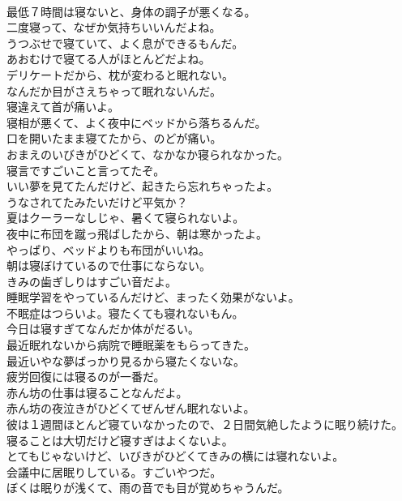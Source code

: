 \documentclass[8pt]{extreport}
\begin{document}
\begin{CJK}{UTF8}{min}
\\	最低７時間は寝ないと、身体の調子が悪くなる。	
\\	二度寝って、なぜか気持ちいいんだよね。	
\\	うつぶせで寝ていて、よく息ができるもんだ。	
\\	あおむけで寝てる人がほとんどだよね。	
\\	デリケートだから、枕が変わると眠れない。	
\\	なんだか目がさえちゃって眠れないんだ。	
\\	寝違えて首が痛いよ。	
\\	寝相が悪くて、よく夜中にベッドから落ちるんだ。	
\\	口を開いたまま寝てたから、のどが痛い。	
\\	おまえのいびきがひどくて、なかなか寝られなかった。	
\\	寝言ですごいこと言ってたぞ。	
\\	いい夢を見てたんだけど、起きたら忘れちゃったよ。	
\\	うなされてたみたいだけど平気か？	
\\	夏はクーラーなしじゃ、暑くて寝られないよ。	
\\	夜中に布団を蹴っ飛ばしたから、朝は寒かったよ。	
\\	やっぱり、ベッドよりも布団がいいね。	
\\	朝は寝ぼけているので仕事にならない。	
\\	きみの歯ぎしりはすごい音だよ。	
\\	睡眠学習をやっているんだけど、まったく効果がないよ。	
\\	不眠症はつらいよ。寝たくても寝れないもん。	
\\	今日は寝すぎてなんだか体がだるい。	
\\	最近眠れないから病院で睡眠薬をもらってきた。	
\\	最近いやな夢ばっかり見るから寝たくないな。	
\\	疲労回復には寝るのが一番だ。	
\\	赤ん坊の仕事は寝ることなんだよ。	
\\	赤ん坊の夜泣きがひどくてぜんぜん眠れないよ。	
\\	彼は１週間ほとんど寝ていなかったので、２日間気絶したように眠り続けた。	
\\	寝ることは大切だけど寝すぎはよくないよ。	
\\	とてもじゃないけど、いびきがひどくてきみの横には寝れないよ。	
\\	会議中に居眠りしている。すごいやつだ。	
\\	ぼくは眠りが浅くて、雨の音でも目が覚めちゃうんだ。	

\end{CJK}
\end{document}
